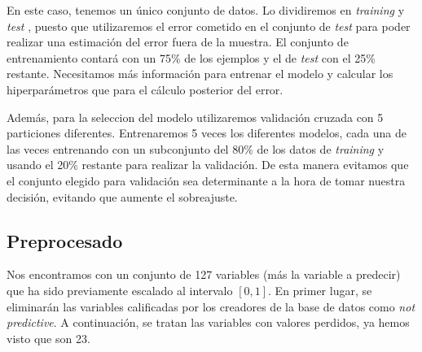 \documentclass[a4paper, 20pt]{article}
\newcommand{\training}{\textit{training }}
\newcommand{\test}{\textit{test }}
\begin{document}
En este caso, tenemos un único conjunto de datos. Lo dividiremos en \training y \test, puesto que utilizaremos el error cometido en el conjunto de \test para poder realizar una estimación del error fuera de la muestra. El conjunto de entrenamiento contará con un 75\% de los ejemplos y el de \test con el 25\% restante. Necesitamos más información para entrenar el modelo y calcular los hiperparámetros que para el cálculo posterior del error.

Además, para la seleccion del modelo utilizaremos validación cruzada con 5 particiones diferentes. Entrenaremos 5 veces los diferentes modelos, cada una de las veces entrenando con un subconjunto del 80\% de los datos de \training y usando el 20\% restante para realizar la validación. De esta manera evitamos que el conjunto elegido para validación sea determinante a la hora de tomar nuestra decisión, evitando que aumente el sobreajuste.


\subsection{Preprocesado}

Nos encontramos con un conjunto de 127 variables (más la variable a predecir) que ha sido previamente escalado al intervalo $[0,1]$. En primer lugar, se eliminarán las variables calificadas por los creadores de la base de datos como \textit{not predictive}. A continuación, se tratan las variables con valores perdidos, ya hemos visto que son 23.  
\end{document}

